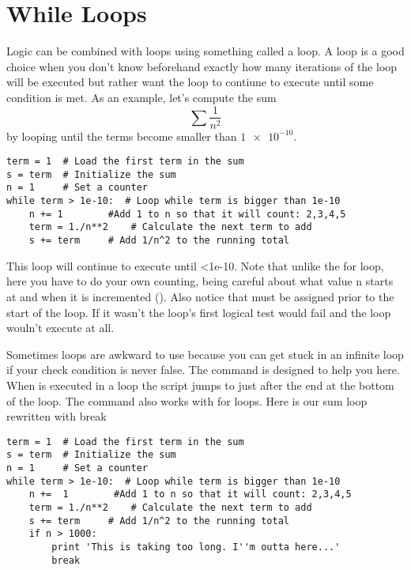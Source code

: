 \section{While Loops}
Logic can be combined with loops using something called a
 loop.  A  loop is a good choice when you
don't know beforehand exactly how many iterations of the loop will be
executed but rather want the loop to contiune to execute until some
condition is met.  As an example, let's compute the sum
\begin{equation}
\sum \frac{1}{n^2}
\end{equation}
by looping until the terms become smaller than $\num{1e-10}$.
\begin{Verbatim}
term = 1  # Load the first term in the sum
s = term  # Initialize the sum
n = 1     # Set a counter
while term > 1e-10:  # Loop while term is bigger than 1e-10
    n += 1        #Add 1 to n so that it will count: 2,3,4,5
    term = 1./n**2    # Calculate the next term to add
    s += term     # Add 1/n^2 to the running total
\end{Verbatim}
This loop will continue to execute until <1e-10. Note
that unlike the for loop, here you have to do your own counting, being
careful about what value n starts at and when it is incremented
(). Also notice that  must be assigned
prior to the start of the loop.  If it wasn't the loop's first logical
test would fail and the loop wouln't execute at all.

Sometimes  loops are awkward to use because you can get
stuck in an infinite loop if your check condition is never false. The
 command is designed to help you here. When
 is executed in a loop the script jumps to just after
the end at the bottom of the loop. The  command also
works with for loops. Here is our sum loop rewritten with break
\begin{Verbatim}
term = 1  # Load the first term in the sum
s = term  # Initialize the sum
n = 1     # Set a counter
while term > 1e-10:  # Loop while term is bigger than 1e-10
    n +=  1        #Add 1 to n so that it will count: 2,3,4,5
    term = 1./n**2    # Calculate the next term to add
    s += term     # Add 1/n^2 to the running total
    if n > 1000:
        print 'This is taking too long. I''m outta here...'
        break
\end{Verbatim}

